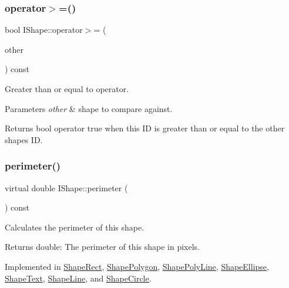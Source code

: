 \subsubsection{\texorpdfstring{operator$>$=()}{operator>=()}}
{\footnotesize\ttfamily bool I\+Shape\+::operator$>$= (\begin{DoxyParamCaption}\item[{const \mbox{\hyperlink{class_i_shape}{I\+Shape}} \&}]{other }\end{DoxyParamCaption}) const}



Greater than or equal to operator. 


\begin{DoxyParams}{Parameters}
{\em other} & shape to compare against. \\
\hline
\end{DoxyParams}
\begin{DoxyReturn}{Returns}
bool operator true when this ID is greater than or equal to the other shape\textquotesingle{}s ID. 
\end{DoxyReturn}
\mbox{\label{class_i_shape_a485f6770c4e56b31c76d368b959b6f00}} 
\subsubsection{\texorpdfstring{perimeter()}{perimeter()}}
{\footnotesize\ttfamily virtual double I\+Shape\+::perimeter (\begin{DoxyParamCaption}{ }\end{DoxyParamCaption}) const\hspace{0.3cm}{\ttfamily [pure virtual]}}



Calculates the perimeter of this shape. 

\begin{DoxyReturn}{Returns}
double\+: The perimeter of this shape in pixels. 
\end{DoxyReturn}


Implemented in \mbox{\hyperlink{class_shape_rect_a7dba46671dfd64188b37bff161d3bb89}{Shape\+Rect}}, \mbox{\hyperlink{class_shape_polygon_acb81cc3272ad00038abd6f1a7a155b2e}{Shape\+Polygon}}, \mbox{\hyperlink{class_shape_poly_line_a3d6664ada9c9dd883303a3dcb63d6188}{Shape\+Poly\+Line}}, \mbox{\hyperlink{class_shape_ellipse_a397c01c912105854e065f6c2d766f73a}{Shape\+Ellipse}}, \mbox{\hyperlink{class_shape_text_a01a24fe247554c614f98756f964ca0f8}{Shape\+Text}}, \mbox{\hyperlink{class_shape_line_a68b22013926993e9bd9c2d146519a5af}{Shape\+Line}}, and \mbox{\hyperlink{class_shape_circle_ad393d13676b0d0fcb36346b9a90b74af}{Shape\+Circle}}.

